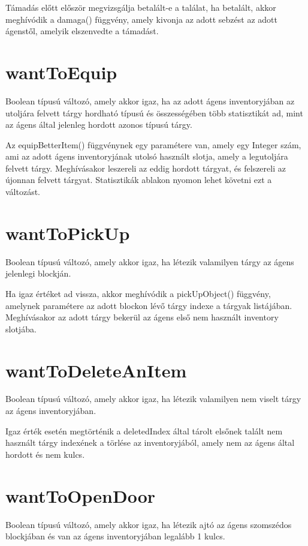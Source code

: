 Támadás előtt először megvizsgálja betalált-e a találat, ha betalált, akkor meghívódik a damaga() függvény, amely
kivonja az adott sebzést az adott ágenstől, amelyik elszenvedte a támadást.

\section{wantToEquip}

Boolean típusú változó, amely akkor igaz, ha az adott ágens inventoryjában az utoljára felvett tárgy hordható
típusú és összességében több statisztikát ad, mint az ágens által jelenleg hordott azonos típusú tárgy.

Az equipBetterItem() függvénynek egy paramétere van, amely egy Integer szám, ami az adott ágens inventoryjának utolsó
használt slotja, amely a legutoljára felvett tárgy. Meghívásakor leszereli az eddig hordott tárgyat, és felszereli az újonnan felvett tárgyat.
Statisztikák ablakon nyomon lehet követni ezt a változást.

\section{wantToPickUp}

Boolean típusú változó, amely akkor igaz, ha létezik valamilyen tárgy az ágens jelenlegi blockján.

Ha igaz értéket ad vissza, akkor meghívódik a pickUpObject() függvény, amelynek paramétere az adott blockon lévő tárgy
indexe a tárgyak listájában. Meghívásakor az adott tárgy bekerül az ágens első nem használt inventory slotjába.

\section{wantToDeleteAnItem}

Boolean típusú változó, amely akkor igaz, ha létezik valamilyen nem viselt tárgy az ágens inventoryjában.

Igaz érték esetén megtörténik a deletedIndex által tárolt elsőnek talált nem használt tárgy indexének a törlése az inventoryjából, 
amely nem az ágens által hordott és nem kulcs.

\section{wantToOpenDoor}

Boolean típusú változó, amely akkor igaz, ha létezik ajtó az ágens szomszédos blockjában és van az ágens inventoryjában legalább 1 kulcs.

